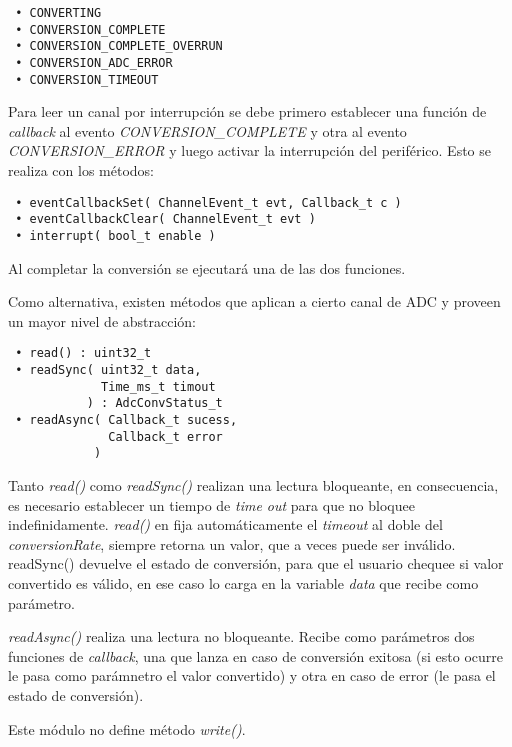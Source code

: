 
\begin{verbatim}
 • CONVERTING
 • CONVERSION_COMPLETE
 • CONVERSION_COMPLETE_OVERRUN
 • CONVERSION_ADC_ERROR
 • CONVERSION_TIMEOUT
\end{verbatim}

Para leer un canal por interrupción se debe primero establecer una función de \emph{callback} al evento \emph{CONVERSION\_COMPLETE} y otra al evento  \emph{CONVERSION\_ERROR} y luego activar la interrupción del periférico. Esto se realiza con los métodos:

\begin{verbatim}
 • eventCallbackSet( ChannelEvent_t evt, Callback_t c )
 • eventCallbackClear( ChannelEvent_t evt )
 • interrupt( bool_t enable )
\end{verbatim}

Al completar la conversión se ejecutará una de las dos funciones.


Como alternativa, existen métodos que aplican a cierto canal de ADC y proveen un mayor nivel de abstracción:

\begin{verbatim}
 • read() : uint32_t
 • readSync( uint32_t data, 
             Time_ms_t timout 
           ) : AdcConvStatus_t
 • readAsync( Callback_t sucess, 
              Callback_t error 
            )
\end{verbatim}

Tanto \emph{read()} como \emph{readSync()} realizan una lectura bloqueante, en consecuencia, es necesario establecer un tiempo de \textit{time out} para que no bloquee indefinidamente. \emph{read()} en fija automáticamente el \emph{timeout} al doble del \emph{conversionRate}, siempre retorna un valor, que a veces puede ser inválido. {readSync()} devuelve el estado de conversión, para que el usuario chequee si valor convertido es válido, en ese caso lo carga en la variable \emph{data} que recibe como parámetro.

\emph{readAsync()} realiza una lectura no bloqueante. Recibe como parámetros dos funciones de \emph{callback}, una que lanza en caso de conversión exitosa (si esto ocurre le pasa como parámnetro el valor convertido) y otra en caso de error (le pasa el estado de conversión).

Este módulo no define método \emph{write()}.

